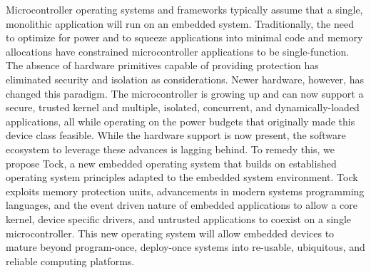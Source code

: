 

Microcontroller operating systems and frameworks typically assume that a single,
monolithic application will run on an embedded system.
Traditionally, the need to optimize for power and to squeeze applications into
minimal code and memory allocations have constrained microcontroller
applications to be single-function.
The absence of hardware primitives capable of providing protection has
eliminated security and isolation as considerations.
Newer hardware, however, has changed this paradigm.
The microcontroller is growing up and can now support a secure, trusted kernel
and multiple, isolated, concurrent, and dynamically-loaded applications, all
while operating on the power budgets that originally made this device class
feasible.
While the hardware support is now present, the software ecosystem to
leverage these advances is lagging behind.
To remedy this, we propose Tock, a new embedded operating system that builds
on established operating system principles adapted to the embedded system
environment.
Tock exploits memory protection units, advancements in modern systems
programming languages, and the event driven nature of embedded applications to
allow a core kernel, device specific drivers, and untrusted applications to
coexist on a single microcontroller.
This new operating system will allow embedded devices to mature beyond
program-once, deploy-once systems into re-usable, ubiquitous, and reliable
computing platforms.





